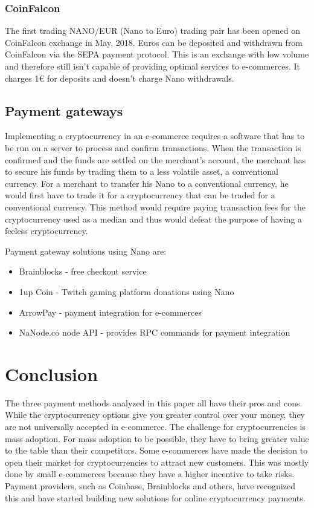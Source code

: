 \documentclass{ferseminar}
\begin{document}
\subsubsection{CoinFalcon}
The first trading NANO/EUR (Nano to Euro) trading pair has been opened on CoinFalcon exchange in May, 2018. Euros can be deposited and withdrawn from CoinFalcon via the SEPA payment protocol. This is an exchange with low volume and therefore still isn't capable of providing optimal services to e-commerces. It charges 1€ for deposits and doesn't charge Nano withdrawals. 
 
\subsection{Payment gateways}
Implementing a cryptocurrency in an e-commerce requires a software that has to be run on a server to process and confirm transactions. When the transaction is confirmed and the funds are settled on the merchant's account, the merchant has to secure his funds by trading them to a less volatile asset, a conventional currency. For a merchant to transfer his Nano to a conventional currency, he would first have to trade it for a cryptocurrency that can be traded for a conventional currency. This method would require paying transaction fees for the cryptocurrency used as a median and thus would defeat the purpose of having a feeless cryptocurrency. 

Payment gateway solutions using Nano are:
\begin{itemize}
	\item Brainblocks -  free checkout service
	\item 1up Coin - Twitch gaming platform donations using Nano
	\item ArrowPay - payment integration for e-commerces
	\item NaNode.co node API - provides RPC commands for payment integration
\end{itemize}

\section{Conclusion}
The three payment methods analyzed in this paper all have their pros and cons. While the cryptocurrency options give you greater control over your money, they are not universally accepted in e-commerce. The challenge for cryptocurrencies is mass adoption. For mass adoption to be possible, they have to bring greater value to the table than their competitors. Some e-commerces have made the decision to open their market for cryptocurrencies to attract new customers. This was mostly done by small e-commerces because they have a higher incentive to take risks. Payment providers, such as Coinbase, Brainblocks and others, have recognized this and have started building new solutions for online cryptocurrency payments.
\end{document}
